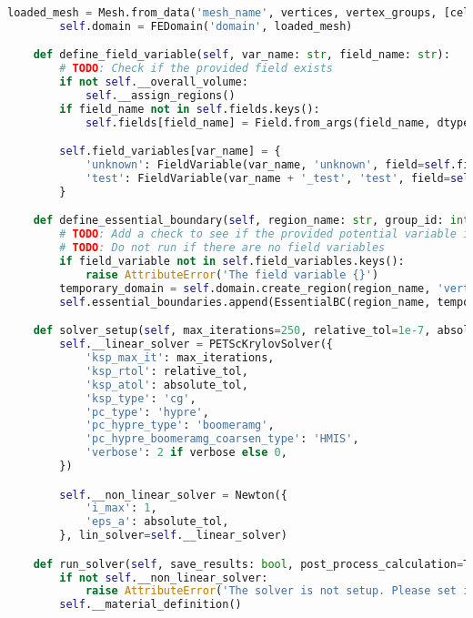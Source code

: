 \begin{lstlisting}[language=Python,caption={Class interfacing to SfePy and contains routines for the PHM and spherical model \gls{FEM} solution.},captionpos=b,label=lst:fem_solver_class]
        loaded_mesh = Mesh.from_data('mesh_name', vertices, vertex_groups, [cells], [cell_groups], [connectivity])
        self.domain = FEDomain('domain', loaded_mesh)

    def define_field_variable(self, var_name: str, field_name: str):
        # TODO: Check if the provided field exists
        if not self.__overall_volume:
            self.__assign_regions()
        if field_name not in self.fields.keys():
            self.fields[field_name] = Field.from_args(field_name, dtype=np.float64, shape=(1, ), region=self.__overall_volume, approx_order=1)

        self.field_variables[var_name] = {
            'unknown': FieldVariable(var_name, 'unknown', field=self.fields[field_name]),
            'test': FieldVariable(var_name + '_test', 'test', field=self.fields[field_name], primary_var_name=var_name),
        }

    def define_essential_boundary(self, region_name: str, group_id: int, field_variable: str, field_value: float):
        # TODO: Add a check to see if the provided potential variable is a defined potential
        # TODO: Do not run if there are no field variables
        if field_variable not in self.field_variables.keys():
            raise AttributeError('The field variable {}')
        temporary_domain = self.domain.create_region(region_name, 'vertices of group ' + str(group_id), 'facet', add_to_regions=False)
        self.essential_boundaries.append(EssentialBC(region_name, temporary_domain, {field_variable + '.all' : field_value}))

    def solver_setup(self, max_iterations=250, relative_tol=1e-7, absolute_tol=1e-3, verbose=False):
        self.__linear_solver = PETScKrylovSolver({
            'ksp_max_it': max_iterations,
            'ksp_rtol': relative_tol,
            'ksp_atol': absolute_tol,
            'ksp_type': 'cg',
            'pc_type': 'hypre',
            'pc_hypre_type': 'boomeramg',
            'pc_hypre_boomeramg_coarsen_type': 'HMIS',
            'verbose': 2 if verbose else 0,
        })

        self.__non_linear_solver = Newton({
            'i_max': 1,
            'eps_a': absolute_tol,
        }, lin_solver=self.__linear_solver)

    def run_solver(self, save_results: bool, post_process_calculation=True, output_dir=None, output_file_name=None):
        if not self.__non_linear_solver:
            raise AttributeError('The solver is not setup. Please set it up before calling run.')
        self.__material_definition()


\end{lstlisting}
